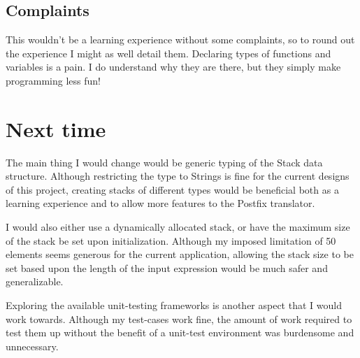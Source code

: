 \documentclass[a4paper,12pt]{article}
\begin{document}
\subsection*{Complaints}
This wouldn't be a learning experience without some complaints, so to round out the experience I might as well detail them.  
Declaring types of functions and variables is a pain.  I do understand why they are there, but they simply make programming
less fun!


\section*{Next time}
The main thing I would change would be generic typing of the Stack data structure.  Although restricting the type to 
Strings is fine for the current designs of this project, creating stacks of different types would be beneficial both as a learning experience
and to allow more features to the Postfix translator.

I would also either use a dynamically allocated stack, or have the maximum size of the stack be set upon initialization.  Although my 
imposed limitation of 50 elements seems generous for the current application, allowing the stack size to be set based upon 
the length of the input expression would be much safer and generalizable.

Exploring the available unit-testing frameworks is another aspect that I would work towards.  Although my test-cases work fine,
the amount of work required to test them up without the benefit of a unit-test environment was burdensome and unnecessary. 

\end{document}
